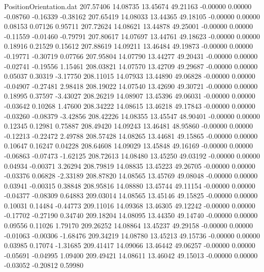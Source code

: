 \begin{filecontents}{PositionOrientation.dat}
 207.57406   14.08735   13.45674    49.21163   -0.00000    0.00000   -0.08760   -0.16339   -0.38162
 207.65419   14.08033   13.44365    49.18105   -0.00000    0.00000    0.08153    0.07126    0.95711
 207.72624   14.08621   13.44878    49.25001   -0.00000    0.00000   -0.11559   -0.01460   -0.79791
 207.80617   14.07697   13.44761    49.18623   -0.00000    0.00000    0.18916    0.21529    0.15612
 207.88619   14.09211   13.46484    49.19873   -0.00000    0.00000   -0.19771   -0.30719    0.07766
 207.95804   14.07790   13.44277    49.20431   -0.00000    0.00000   -0.02741   -0.19556    1.15461
 208.03821   14.07570   13.42709    49.29687   -0.00000    0.00000    0.05037    0.30319   -3.17750
 208.11015   14.07933   13.44890    49.06828   -0.00000    0.00000   -0.04907   -0.27481    2.98418
 208.19022   14.07540   13.42690    49.30721   -0.00000    0.00000    0.18995    0.37597   -3.43027
 208.26219   14.08907   13.45396    49.06031   -0.00000    0.00000   -0.03642    0.10268    1.47600
 208.34222   14.08615   13.46218    49.17843   -0.00000    0.00000   -0.03260   -0.08379   -3.42856
 208.42226   14.08355   13.45547    48.90401   -0.00000    0.00000    0.12345    0.12981    0.75887
 208.49420   14.09243   13.46481    48.95860   -0.00000    0.00000   -0.12213   -0.22472    2.49788
 208.57428   14.08265   13.44681    49.15865   -0.00000    0.00000    0.10647    0.16247    0.04228
 208.64608   14.09029   13.45848    49.16169   -0.00000    0.00000   -0.06863   -0.07473   -1.62125
 208.72613   14.08480   13.45250    49.03192   -0.00000    0.00000    0.04934   -0.00371    3.26294
 208.79819   14.08835   13.45223    49.26705   -0.00000    0.00000   -0.03376    0.06828   -2.33189
 208.87820   14.08565   13.45769    49.08048   -0.00000    0.00000    0.03941   -0.00315    0.38848
 208.95816   14.08880   13.45744    49.11154   -0.00000    0.00000   -0.04377   -0.08309    0.64883
 209.03014   14.08565   13.45146    49.15825   -0.00000    0.00000    0.10031    0.14484   -0.44773
 209.11016   14.09368   13.46305    49.12242   -0.00000    0.00000   -0.17702   -0.27190    0.34740
 209.18204   14.08095   13.44350    49.14740   -0.00000    0.00000    0.09556    0.11026    1.79170
 209.26252   14.08864   13.45237    49.29158   -0.00000    0.00000   -0.01063   -0.00306   -1.68476
 209.34219   14.08780   13.45213    49.15736   -0.00000    0.00000    0.03985    0.17074   -1.31685
 209.41417   14.09066   13.46442    49.06257   -0.00000    0.00000   -0.05691   -0.04995    1.09400
 209.49421   14.08611   13.46042    49.15013   -0.00000    0.00000   -0.03052   -0.20812    0.59980

\end{filecontents}
